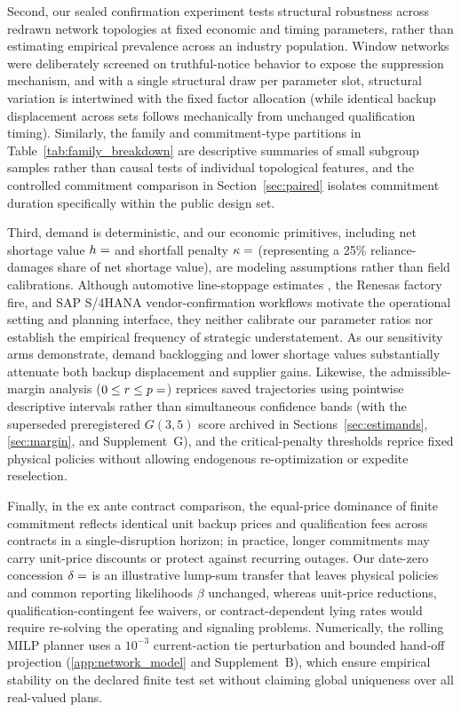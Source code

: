\documentclass[preprint,11pt,authoryear]{elsarticle}
\begin{document}
Second, our sealed confirmation experiment tests structural robustness across redrawn network topologies at fixed economic and timing parameters, rather than estimating empirical prevalence across an industry population. Window networks were deliberately screened on truthful-notice behavior to expose the suppression mechanism, and with a single structural draw per parameter slot, structural variation is intertwined with the fixed factor allocation (while identical backup displacement across sets follows mechanically from unchanged qualification timing). Similarly, the family and commitment-type partitions in Table~\ref{tab:family_breakdown} are descriptive summaries of small subgroup samples rather than causal tests of individual topological features, and the controlled commitment comparison in Section~\ref{sec:paired} isolates commitment duration specifically within the public design set.

Third, demand is deterministic, and our economic primitives, including net shortage value $h=\pc{h}$ and shortfall penalty $\kappa=\pc{kappa}$ (representing a 25\% reliance-damages share of net shortage value), are modeling assumptions rather than field calibrations. Although automotive line-stoppage estimates \citep{kang2018sequencing}, the Renesas factory fire, and SAP S/4HANA vendor-confirmation workflows motivate the operational setting and planning interface, they neither calibrate our parameter ratios nor establish the empirical frequency of strategic understatement. As our sensitivity arms demonstrate, demand backlogging and lower shortage values substantially attenuate both backup displacement and supplier gains. Likewise, the admissible-margin analysis ($0\le r\le p=\pc{rMax}$) reprices saved trajectories using pointwise descriptive intervals rather than simultaneous confidence bands (with the superseded preregistered $G(3,5)$ score archived in Sections~\ref{sec:estimands}, \ref{sec:margin}, and Supplement~G), and the critical-penalty thresholds reprice fixed physical policies without allowing endogenous re-optimization or expedite reselection.

Finally, in the ex ante contract comparison, the equal-price dominance of finite commitment reflects identical unit backup prices and qualification fees across contracts in a single-disruption horizon; in practice, longer commitments may carry unit-price discounts or protect against recurring outages. Our date-zero concession $\delta=\fd{delta}$ is an illustrative lump-sum transfer that leaves physical policies and common reporting likelihoods $\beta$ unchanged, whereas unit-price reductions, qualification-contingent fee waivers, or contract-dependent lying rates would require re-solving the operating and signaling problems. Numerically, the rolling MILP planner uses a $10^{-3}$ current-action tie perturbation and bounded hand-off projection (\ref{app:network_model} and Supplement~B), which ensure empirical stability on the declared finite test set without claiming global uniqueness over all real-valued plans.
\end{document}
